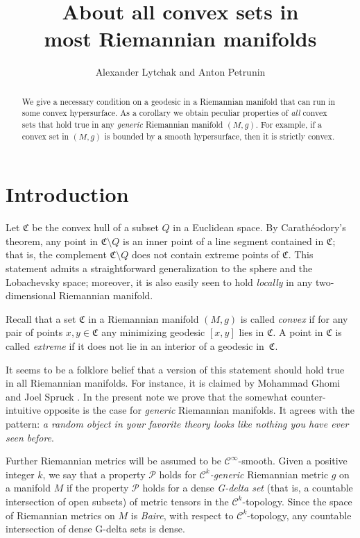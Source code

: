 \documentclass[a4paper,10pt]{article}
\def\thetitle{About all convex sets in\\ most Riemannian manifolds}
\begin{document}
\title{\thetitle}
\author{Alexander Lytchak and Anton Petrunin}
\date{}
\maketitle

\begin{abstract}
We give a necessary condition on a geodesic in a Riemannian manifold that can run in some convex hypersurface.
As a corollary we obtain peculiar properties of \emph{all} convex sets that hold true in any \emph{generic} Riemannian manifold $(M,g)$.
For example, if a convex set in $(M,g)$ is bounded by a smooth hypersurface, then it is strictly convex.
\end{abstract}

\section{Introduction}
Let $\mathfrak{C}$ be the convex hull of a subset $Q$ in a Euclidean space.
By Carathéodory's theorem, any point in $\mathfrak{C}\setminus Q$ is an inner point of a line segment contained in $\mathfrak{C}$;
that is, the complement $\mathfrak{C} \setminus Q$ does not contain extreme points of $\mathfrak{C}$.
This statement admits a straightforward generalization to the sphere and the  Lobachevsky space; moreover, it  is also easily seen to hold \emph{locally} in any two-dimensional Riemannian manifold.

Recall that a set $\mathfrak{C}$ in a Riemannian manifold $(M,g)$ is called \emph{convex} if for any pair of points $x,y\in \mathfrak{C}$ any minimizing geodesic $[x,y]$ lies in $\mathfrak{C}$.
A point in $\mathfrak{C}$ is called \emph{extreme} if it does not lie in an interior of a geodesic in~$\mathfrak{C}$.

It seems to be a folklore belief that a version of this statement should hold true in all Riemannian manifolds.
For instance, it is claimed by Mohammad Ghomi and Joel Spruck \cite[Lemma 9.1]{Ghomi}.
In the present note we prove that the somewhat counter-intuitive opposite is the case for \emph{generic} Riemannian manifolds.
It agrees with the pattern: \emph{a random object in your favorite theory  looks like nothing you have ever seen before}.

Further Riemannian metrics will be assumed to be $\mathcal C^\infty$-smooth.
Given a positive integer $k$, we say that a property $\mathcal P$ holds for \emph{$\mathcal C^k$-generic} Riemannian metric $g$ on a manifold $M$ 
if the property $\mathcal P$ holds for a dense \emph{G-delta set} (that is, a countable intersection of open subsets) of metric tensors in the $\mathcal C^k$-topology.
Since the space of Riemannian metrics  on $M$ is \emph{Baire}, with  respect to $\mathcal C^k$-topology, any 
countable intersection of dense G-delta sets is dense.
\end{document}
